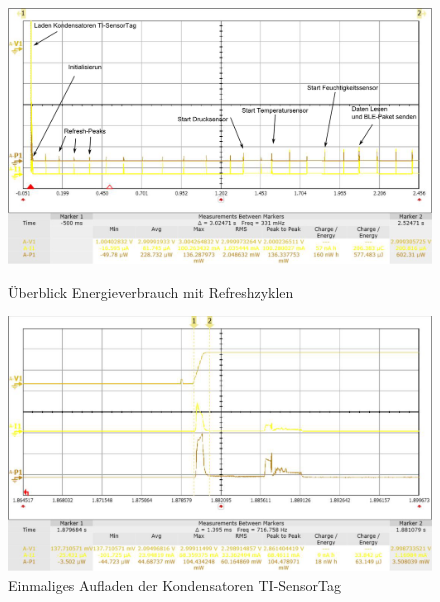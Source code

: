 \begin{figure}[p]
  \includegraphics[width=1.0\textwidth]{3Vorgehen/imag/Ueberblick.png}
  \caption{Überblick Energieverbrauch mit Refreshzyklen}
  \label{energie_ueberblick}
 
  \includegraphics[width=1.0\textwidth]{3Vorgehen/imag/Energie_Laden_Kondensatoren_Sensortag.png}
  \caption{Einmaliges Aufladen der Kondensatoren TI-SensorTag}
  \label{energie_kondensatoren_sensortag}
\end{figure}

\clearpage

